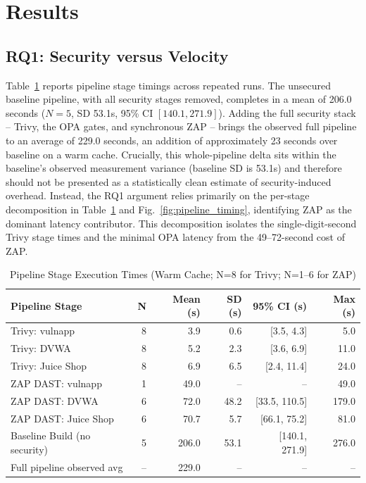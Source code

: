 \documentclass[conference]{IEEEtran}
\begin{document}
\section{Results}
\label{sec:results}

\subsection{RQ1: Security versus Velocity}
Table~\ref{tab:timings} reports pipeline stage timings across repeated runs. The unsecured baseline pipeline, with all security stages removed, completes in a mean of 206.0 seconds ($N=5$, SD 53.1s, 95\% CI $[140.1, 271.9]$). Adding the full security stack -- Trivy, the OPA gates, and synchronous ZAP -- brings the observed full pipeline to an average of 229.0 seconds, an addition of approximately 23 seconds over baseline on a warm cache. Crucially, this whole-pipeline delta sits within the baseline's observed measurement variance (baseline SD is 53.1s) and therefore should not be presented as a statistically clean estimate of security-induced overhead. Instead, the RQ1 argument relies primarily on the per-stage decomposition in Table~\ref{tab:timings} and Fig.~\ref{fig:pipeline_timing}, identifying ZAP as the dominant latency contributor. This decomposition isolates the single-digit-second Trivy stage times and the minimal OPA latency from the 49--72-second cost of ZAP.

\begin{table}[t]
\centering
\caption{Pipeline Stage Execution Times (Warm Cache; N=8 for Trivy; N=1--6 for ZAP)}
\label{tab:timings}
\footnotesize
\begin{tabular}{|l|r|r|r|r|r|}
\hline
\textbf{Pipeline Stage} & \textbf{N} & \textbf{Mean (s)} & \textbf{SD (s)} & \textbf{95\% CI (s)} & \textbf{Max (s)} \\
\hline
Trivy: vulnapp                & 8 & 3.9   & 0.6  & [3.5, 4.3]     & 5.0 \\
Trivy: DVWA                   & 8 & 5.2   & 2.3  & [3.6, 6.9]     & 11.0 \\
Trivy: Juice Shop             & 8 & 6.9   & 6.5  & [2.4, 11.4]    & 24.0 \\
ZAP DAST: vulnapp             & 1 & 49.0  & --   & --             & 49.0 \\
ZAP DAST: DVWA                & 6 & 72.0  & 48.2 & [33.5, 110.5]  & 179.0 \\
ZAP DAST: Juice Shop          & 6 & 70.7  & 5.7  & [66.1, 75.2]   & 81.0 \\
Baseline Build (no security)  & 5 & 206.0 & 53.1 & [140.1, 271.9] & 276.0 \\
Full pipeline observed avg    & -- & 229.0 & --  & --             & -- \\
\hline
\end{tabular}
\end{table}
\end{document}
